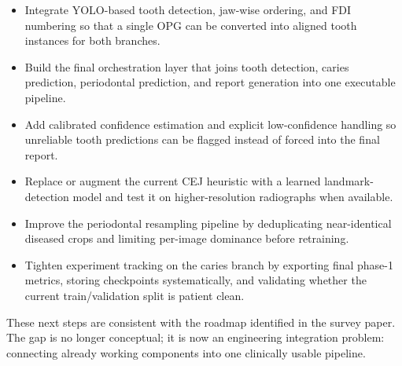 \begin{itemize}
  \item Integrate YOLO-based tooth detection, jaw-wise ordering, and FDI numbering so that a single OPG can be converted into aligned tooth instances for both branches.
  \item Build the final orchestration layer that joins tooth detection, caries prediction, periodontal prediction, and report generation into one executable pipeline.
  \item Add calibrated confidence estimation and explicit low-confidence handling so unreliable tooth predictions can be flagged instead of forced into the final report.
  \item Replace or augment the current CEJ heuristic with a learned landmark-detection model and test it on higher-resolution radiographs when available.
  \item Improve the periodontal resampling pipeline by deduplicating near-identical diseased crops and limiting per-image dominance before retraining.
  \item Tighten experiment tracking on the caries branch by exporting final phase-1 metrics, storing checkpoints systematically, and validating whether the current train/validation split is patient clean.
\end{itemize}

These next steps are consistent with the roadmap identified in the survey
paper. The gap is no longer conceptual; it is now an engineering integration
problem: connecting already working components into one clinically usable
pipeline.
